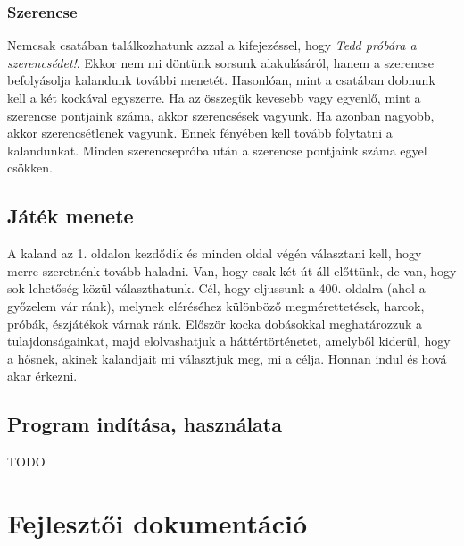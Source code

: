 \documentclass[12pt,a4paper,oneside]{report}
\begin{document}
      \subsection{Szerencse}
        Nemcsak csatában találkozhatunk azzal a kifejezéssel, hogy
        \emph{Tedd próbára a szerencsédet!}. Ekkor nem mi döntünk sorsunk
        alakulásáról, hanem a szerencse befolyásolja kalandunk további
        menetét. Hasonlóan, mint a csatában dobnunk kell a két kockával
        egyszerre. Ha az összegük kevesebb vagy egyenlő, mint a szerencse
        pontjaink száma, akkor szerencsések vagyunk. Ha azonban nagyobb, akkor
        szerencsétlenek vagyunk. Ennek fényében kell tovább folytatni a
        kalandunkat. Minden szerencsepróba után a szerencse pontjaink száma
        egyel csökken.
    
      \section{Játék menete}
        A kaland az 1. oldalon kezdődik és minden oldal végén választani kell,
        hogy merre szeretnénk tovább haladni. Van, hogy csak két út áll
        előttünk, de van, hogy sok lehetőség közül választhatunk. Cél, hogy
        eljussunk a 400. oldalra (ahol a győzelem vár ránk), melynek eléréséhez
        különböző megmérettetések, harcok, próbák, észjátékok várnak ránk.
        Először kocka dobásokkal meghatározzuk a tulajdonságainkat, majd
        elolvashatjuk a háttértörténetet, amelyből kiderül, hogy a hősnek,
        akinek kalandjait mi választjuk meg, mi a célja. Honnan indul és
        hová akar érkezni.
    \section{Program indítása, használata}
      TODO
\chapter{Fejlesztői dokumentáció}
\end{document}

